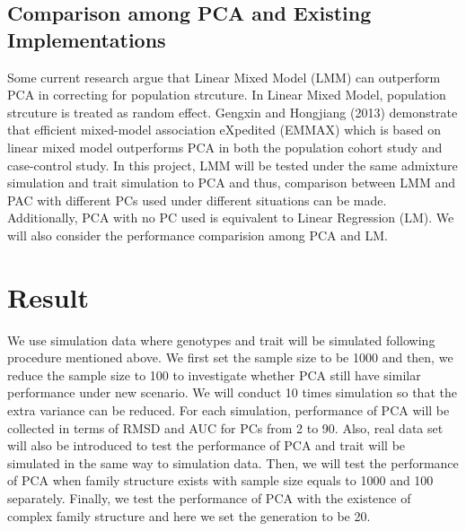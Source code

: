 \documentclass[12pt]{article}
\begin{document}
\subsection{Comparison among PCA and Existing Implementations }

Some current research argue that Linear Mixed Model (LMM) can outperform PCA in correcting for population strcuture.
In Linear Mixed Model, population strcuture is treated as random effect.
Gengxin and Hongjiang (2013) demonstrate that efficient mixed-model association eXpedited (EMMAX) which is based on linear mixed model outperforms PCA in both the population cohort study and case-control study.
In this project, LMM will be tested under the same admixture simulation and trait simulation to PCA and thus, comparison between LMM and PAC with different PCs used under different situations can be made.
Additionally, PCA with no PC used is equivalent to Linear Regression (LM).
We will also consider the performance comparision among PCA and LM. 



\section{Result}

We use simulation data where genotypes and trait will be simulated following procedure mentioned above.
We first set the sample size to be 1000 and then, we reduce the sample size to 100 to investigate whether PCA still have similar performance under new scenario.
We will conduct 10 times simulation so that the extra variance can be reduced.
For each simulation, performance of PCA will be collected in terms of RMSD and AUC for PCs from 2 to 90.
Also, real data set will also be introduced to test the performance of PCA and trait will be simulated in the same way to simulation data.
Then, we will test the performance of PCA when family structure exists with sample size equals to 1000 and 100 separately.
Finally, we test the performance of PCA with the existence of complex family structure and here we set the generation to be 20.
\end{document}
